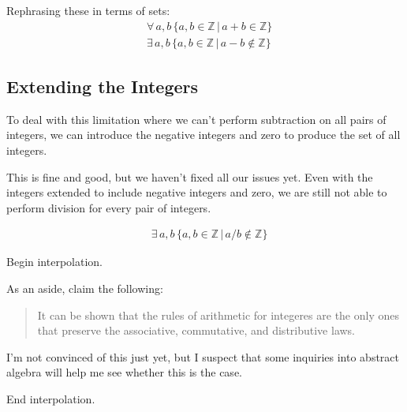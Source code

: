 \documentclass[leqno]{article}
\begin{document}
Rephrasing these in terms of sets:
\begin{align}
    &\forall \, a, b \, \{a, b \in \mathbb{Z} \,|\, a+b \in \mathbb{Z}\}\\
    &\exists \, a, b \, \{a, b \in \mathbb{Z} \,|\, a-b \not\in \mathbb{Z}\}
\end{align}

\subsection{Extending the Integers}

To deal with this limitation
where we can't perform subtraction on all pairs of integers,
we can introduce the negative integers and zero
to produce the set of all integers.

This is fine and good, but we haven't fixed all our issues yet.
Even with the integers extended to include negative integers and zero,
we are still not able to perform division for every pair of integers.

\begin{align}
    &\exists \, a, b \, \{a, b \in \mathbb{Z} \,|\, a/b \not\in \mathbb{Z}\}
\end{align}

\newpage
Begin interpolation.

As an aside, \textcite{fisherIntegratedAlgebraTrigonometry1962} claim the following:
\begin{quote}
    It can be shown that the rules of arithmetic
    for integeres are the only ones that preserve
    the associative, commutative, and distributive
    laws.
\end{quote}

I'm not convinced of this just yet, but I suspect that some inquiries into abstract algebra will help me see whether this is the case.

End interpolation.

\newpage
\printbibliography
\end{document}
